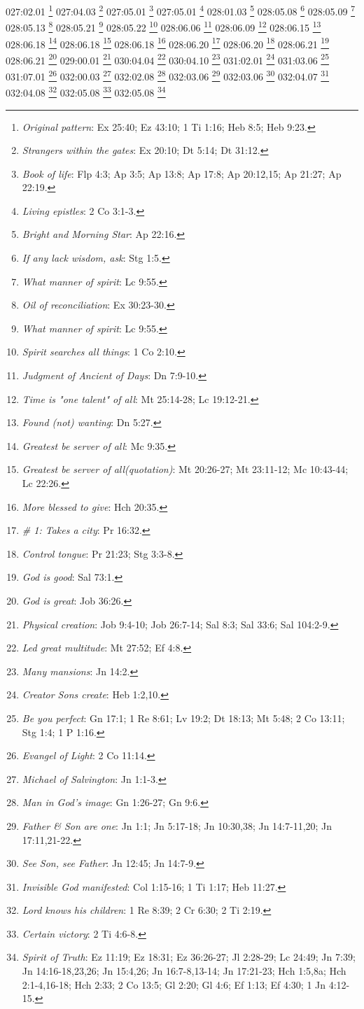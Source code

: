 {027:02.01 \footnote{\textit{Original pattern}: Ex 25:40; Ez 43:10; 1 Ti 1:16; Heb 8:5; Heb 9:23.}
027:04.03 \footnote{\textit{Strangers within the gates}: Ex 20:10; Dt 5:14; Dt 31:12.}
027:05.01 \footnote{\textit{Book of life}: Flp 4:3; Ap 3:5; Ap 13:8; Ap 17:8; Ap 20:12,15; Ap 21:27; Ap 22:19.}
027:05.01 \footnote{\textit{Living epistles}: 2 Co 3:1-3.}
028:01.03 \footnote{\textit{Bright and Morning Star}: Ap 22:16.}
028:05.08 \footnote{\textit{If any lack wisdom, ask}: Stg 1:5.}
028:05.09 \footnote{\textit{What manner of spirit}: Lc 9:55.}
028:05.13 \footnote{\textit{Oil of reconciliation}: Ex 30:23-30.}
028:05.21 \footnote{\textit{What manner of spirit}: Lc 9:55.}
028:05.22 \footnote{\textit{Spirit searches all things}: 1 Co 2:10.}
028:06.06 \footnote{\textit{Judgment of Ancient of Days}: Dn 7:9-10.}
028:06.09 \footnote{\textit{Time is "one talent" of all}: Mt 25:14-28; Lc 19:12-21.}
028:06.15 \footnote{\textit{Found (not) wanting}: Dn 5:27.}
028:06.18 \footnote{\textit{Greatest be server of all}: Mc 9:35.}
028:06.18 \footnote{\textit{Greatest be server of all(quotation)}: Mt 20:26-27; Mt 23:11-12; Mc 10:43-44; Lc 22:26.}
028:06.18 \footnote{\textit{More blessed to give}: Hch 20:35.}
028:06.20 \footnote{\textit{# 1: Takes a city}: Pr 16:32.}
028:06.20 \footnote{\textit{Control tongue}: Pr 21:23; Stg 3:3-8.}
028:06.21 \footnote{\textit{God is good}: Sal 73:1.}
028:06.21 \footnote{\textit{God is great}: Job 36:26.}
029:00.01 \footnote{\textit{Physical creation}: Job 9:4-10; Job 26:7-14; Sal 8:3; Sal 33:6; Sal 104:2-9.}
030:04.04 \footnote{\textit{Led great multitude}: Mt 27:52; Ef 4:8.}
030:04.10 \footnote{\textit{Many mansions}: Jn 14:2.}
031:02.01 \footnote{\textit{Creator Sons create}: Heb 1:2,10.}
031:03.06 \footnote{\textit{Be you perfect}: Gn 17:1; 1 Re 8:61; Lv 19:2; Dt 18:13; Mt 5:48; 2 Co 13:11; Stg 1:4; 1 P 1:16.}
031:07.01 \footnote{\textit{Evangel of Light}: 2 Co 11:14.}
032:00.03 \footnote{\textit{Michael of Salvington}: Jn 1:1-3.}
032:02.08 \footnote{\textit{Man in God's image}: Gn 1:26-27; Gn 9:6.}
032:03.06 \footnote{\textit{Father & Son are one}: Jn 1:1; Jn 5:17-18; Jn 10:30,38; Jn 14:7-11,20; Jn 17:11,21-22.}
032:03.06 \footnote{\textit{See Son, see Father}: Jn 12:45; Jn 14:7-9.}
032:04.07 \footnote{\textit{Invisible God manifested}: Col 1:15-16; 1 Ti 1:17; Heb 11:27.}
032:04.08 \footnote{\textit{Lord knows his children}: 1 Re 8:39; 2 Cr 6:30; 2 Ti 2:19.}
032:05.08 \footnote{\textit{Certain victory}: 2 Ti 4:6-8.}
032:05.08 \footnote{\textit{Spirit of Truth}: Ez 11:19; Ez 18:31; Ez 36:26-27; Jl 2:28-29; Lc 24:49; Jn 7:39; Jn 14:16-18,23,26; Jn 15:4,26; Jn 16:7-8,13-14; Jn 17:21-23; Hch 1:5,8a; Hch 2:1-4,16-18; Hch 2:33; 2 Co 13:5; Gl 2:20; Gl 4:6; Ef 1:13; Ef 4:30; 1 Jn 4:12-15.}
}
